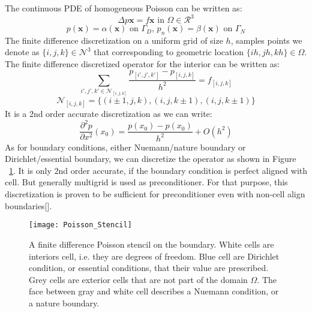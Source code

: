 The continuous PDE of homogeneous Poisson can be written as:
\begin{equation}
\Delta p\mathbf{x} = f\mathbf{x} \text{ in } \Omega \in \mathcal{R}^3
\end{equation}
$$
p(\mathbf{x}) = \alpha(\mathbf{x}) \text{ on } \Gamma_D\text{, } p_n(\mathbf{x}) = \beta(\mathbf{x}) \text{ on } \Gamma_N
$$
The finite difference discretization on a uniform grid of size $h$, samples points we denote as $\{i,j,k\} \in \mathcal{N}^3$ that corresponding to geometric location $\{ih,jh,kh\} \in \Omega$. The finite difference discretized operator for the interior can be written as:
\begin{equation}
\sum_{i',j',k'\in \mathcal{N}_{[i,j,k]}}\frac{p_{[i',j',k']}-p_{[i,j,k]}}{h^2} = f_{[i,j,k]}
\end{equation}
$$
\mathcal{N}_{[i,j,k]} = \{(i\pm1,j,k),(i,j,k\pm1),(i,j,k\pm1)\}
$$
It is a 2nd order accurate discretization as we can write:
$$
\frac{\partial^2 p}{\partial x^2}(x_0) = \frac{p(x_0)-p(x_0)}{h^2} + O(h^2)
$$
As for boundary conditions, either Nuemann/nature boundary or Dirichlet/essential boundary, we can discretize the operator as shown in Figure ~\ref{fig:PoissonBoundary}. It is only 2nd order accurate, if the boundary condition is perfect aligned with cell. But generally multigrid is used as preconditioner. For that purpose, this discretization is proven to be sufficient for preconditioner even with non-cell align boundaries[\cite{aanjaneya2017power}]. 
\begin{figure}[t]
\texttt{[image: Poisson\_Stencil]}
\centering
\label{fig:PoissonBoundary}
\caption{A finite difference Poisson stencil on the boundary. White cells are interiors cell, i.e. they are degrees of freedom. Blue cell are Dirichlet condition, or essential conditions, that their value are prescribed. Grey cells are exterior cells that are not part of the domain $\Omega$. The face between gray and white cell describes a Nuemann condition, or a nature boundary.}
\end{figure}

